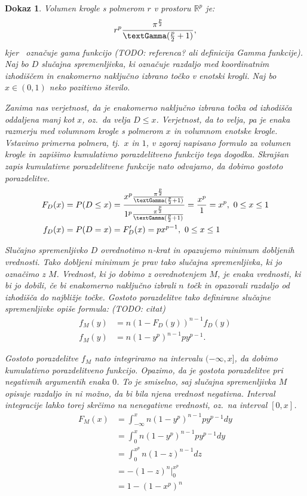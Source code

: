 \documentclass[12pt,a4paper]{article}
\newtheorem{dokaz}{Dokaz}
\begin{document}
\begin{dokaz}

Volumen krogle s polmerom $r$ v prostoru $\mathbb{R}^p$ je: %
$$
r^p \frac{\pi^{\frac{p}{2}}}{\text{\textGamma} (\frac{p}{2}+1)},
$$
kjer \textGamma\ označuje gama funkcijo (TODO: referenca? ali definicija Gamma funkcije). 
Naj bo $D$ slučajna spremenljivka, 
ki označuje razdaljo med koordinatnim izhodiščem in enakomerno naključno izbrano točko v enotski krogli. 
Naj bo $x \in (0,1)$ neko pozitivno število. 

Zanima nas verjetnost, da je enakomerno naključno izbrana točka od izhodišča oddaljena manj kot $x$, oz.~da velja $D \leq x$. 
Verjetnost, da to velja, pa je enaka razmerju med volumnom krogle s polmerom $x$ in volumnom enotske krogle. 
Vstavimo primerna polmera, tj.~$x$ in $1$, v zgoraj napisano formulo za volumen krogle in zapišimo kumulativno porazdelitveno funkcijo tega dogodka. 
Skrajšan zapis kumulativne porazdelitvene funkcije nato odvajamo, da dobimo gostoto porazdelitve.
\begin{align}
F_D(x) & = P(D \leq x) = \frac{x^p \frac{\pi^{\frac{p}{2}}}{\text{\textGamma} (\frac{p}{2}+1)}}{1^p \frac{\pi^{\frac{p}{2}}}{\text{\textGamma} (\frac{p}{2}+1)}} = \frac{x^p}{1} = x^p,\  0 \leq x \leq 1 \\
f_D(x) & = P(D = x) = F_D '(x) = p x^{p-1},\  0 \leq x \leq 1
\end{align}

Slučajno spremenljivko $D$ ovrednotimo $n$-krat in opazujemo minimum dobljenih vrednosti. 
Tako dobljeni minimum je prav tako slučajna spremenljivka, ki jo označimo z $M$. 
Vrednost, ki jo dobimo z ovrednotenjem $M$, je enaka vrednosti, 
ki bi jo dobili, če bi enakomerno naključno izbrali $n$ točk in opazovali razdaljo od izhodišča do najbližje točke. 
Gostoto porazdelitve tako definirane slučajne spremenljivke opiše formula: (TODO: citat) %
\begin{align*}
f_M(y) & = n(1 - F_D(y))^{n-1} f_D(y) \\
f_M(y) & = n(1 - y^p)^{n-1} p y^{p-1}.
\end{align*}

Gostoto porazdelitve $f_M$ nato integriramo na intervalu $(-\infty,x]$, da dobimo kumulativno porazdelitveno funkcijo. 
Opazimo, da je gostota porazdelitve pri negativnih argumentih enaka $0$. 
To je smiselno, saj slučajna spremenljivka $M$ opisuje razdaljo in ni možno, da bi bila njena vrednost negativna. 
Interval integracije lahko torej skrčimo na nenegativne vrednosti, oz.~na interval $[0,x]$.
\begin{align*}
F_M(x) & = \int_{-\infty}^x n(1 - y^p)^{n-1} p y^{p-1} dy \\
& = \int_0^x n(1 - y^p)^{n-1} p y^{p-1} dy \\
& = \int_0^{x^p} n(1-z)^{n-1} dz \\
& = -(1 - z)^n \Big|_0^{x^p} \\
& = 1 - (1 - x^p)^n
\end{align*}


\end{dokaz}
\end{document}
